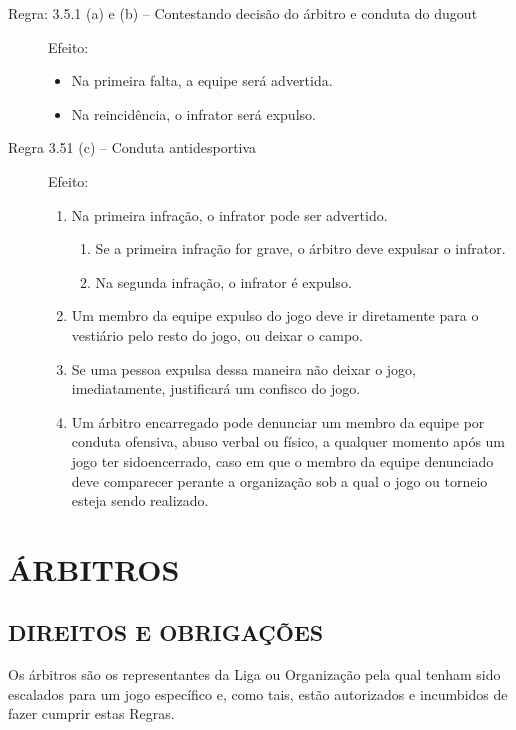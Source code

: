 \begin{description}
	\item[Regra: 3.5.1 (a) e (b) -- Contestando decisão do árbitro e conduta do \gls{dugout}] Efeito:

	\begin{itemize}
		\item Na primeira falta, a equipe será advertida.
		\item Na reincidência, o infrator será expulso.
	\end{itemize}
\item [Regra 3.51 (c) -- Conduta antidesportiva] Efeito:
	\begin{enumerate}[label=(\alph*)]
		\item Na primeira infração, o infrator pode ser advertido.

		\begin{enumerate}[label=\roman*.]
			\item Se a primeira infração for grave, o árbitro deve expulsar o infrator.
			\item Na segunda infração, o infrator é expulso.
		\end{enumerate}

		\item Um membro da equipe expulso do jogo deve ir diretamente para o vestiário pelo resto do jogo, ou deixar o campo.
		\item Se uma pessoa expulsa dessa maneira não deixar o jogo, imediatamente, justificará um confisco do jogo.
		\item Um árbitro encarregado pode denunciar um membro da equipe por conduta ofensiva, abuso verbal ou físico, a qualquer momento após um jogo ter sidoencerrado, caso em que o membro da equipe denunciado deve comparecer
		perante a organização sob a qual o jogo ou torneio esteja sendo realizado.
	\end{enumerate}
\end{description}

\section{ÁRBITROS}

\subsection{DIREITOS E OBRIGAÇÕES}

 Os árbitros são os representantes da Liga ou Organização pela qual tenham sido escalados para um jogo específico e, como tais, estão autorizados e incumbidos de fazer cumprir estas Regras.

